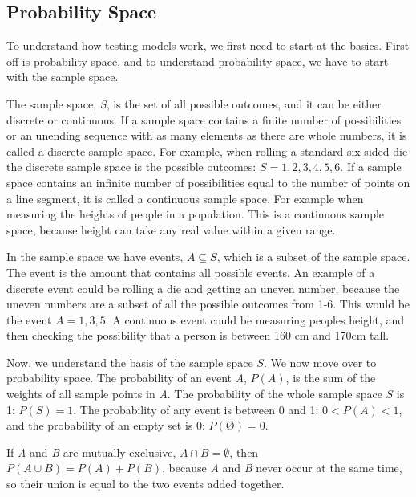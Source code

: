 \subsection{Probability Space}
To understand how testing models work, we first need to start at the basics. First off is probability space, and to understand probability space, we have to start with the sample space. \newline

\noindent The sample space, \textit{S}, is the set of all possible outcomes, and it can be either discrete or continuous. If a sample space contains a finite number of possibilities or an unending sequence with as many elements as there are whole numbers, it is called a discrete sample space. For example, when rolling a standard six-sided die the discrete sample space is the possible outcomes: $S={1,2,3,4,5,6}$. If a sample space contains an infinite number of possibilities equal to the number of points on a line segment, it is called a continuous sample space. For example when measuring the heights of people in a population. This is a continuous sample space, because height can take any real value within a given range.\newline

\noindent In the sample space we have events, $A\subseteq S$, which is a subset of the sample space. The event is the amount that contains all possible events. An example of a discrete event could be rolling a die and getting an uneven number, because the uneven numbers are a subset of all the possible outcomes from 1-6. This would be the event $A={1,3,5}$. A continuous event could be measuring peoples height, and then checking the possibility that a person is between 160 cm and 170cm tall.
\newline

\noindent Now, we understand the basis of the sample space $S$. We now move over to probability space. The probability of an event \textit{A}, $P(A)$, is the sum of the weights of all sample points in \textit{A}.
The probability of the whole sample space $S$ is 1: $P(S)=1$. The probability of any event is between 0 and 1: $0<P(A)<1$, and the probability of an empty set is 0: $P(Ø)=0$.
\newline
\newline

\noindent If \textit{A} and \textit{B} are mutually exclusive, $A \cap B = \emptyset$, then $P(A \cup B) = P(A)+P(B)$, because \textit{A} and \textit{B} never occur at the same time, so their union is equal to the two events added together. 
\newline

